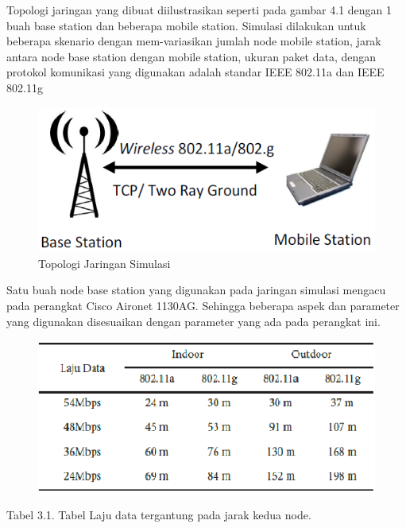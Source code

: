 \documentclass{jtetiproposalskripsi}
\begin{document}
Topologi jaringan yang dibuat diilustrasikan seperti pada gambar 4.1 dengan 1 buah base station dan beberapa mobile station. Simulasi dilakukan untuk beberapa skenario dengan mem-variasikan jumlah node mobile station, jarak antara node base station dengan mobile station, ukuran paket data, dengan protokol komunikasi yang digunakan adalah standar IEEE 802.11a dan IEEE 802.11g

\begin{figure}[ht!]
  \centering
    \includegraphics{gambar/1-1}
    \caption{Topologi Jaringan Simulasi}
    \label{Topologi Jaringan Simulasi}
\end{figure}

Satu buah node base station yang digunakan pada jaringan simulasi mengacu pada perangkat Cisco Aironet 1130AG. Sehingga beberapa aspek dan parameter yang digunakan disesuaikan dengan parameter yang ada pada perangkat ini.

\begin{figure}[ht!]
  \centering
    \includegraphics[width=13cm]{gambar/2-1}
\end{figure}
\vspace{-0.2cm}
\begin{center}
Tabel 3.1. Tabel Laju data tergantung pada jarak kedua node.
\end{center}
\end{document}
